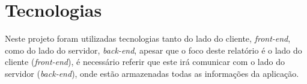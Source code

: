 \chapter{Tecnologias}

Neste projeto foram utilizadas tecnologias tanto do lado do cliente, \textit{front-end}, como do lado do servidor, \textit{back-end}, apesar que o foco deste relatório é o lado do cliente (\textit{front-end}), é necessário referir que este irá comunicar com o lado do servidor (\textit{back-end}), onde estão armazenadas todas as informações da aplicação.



